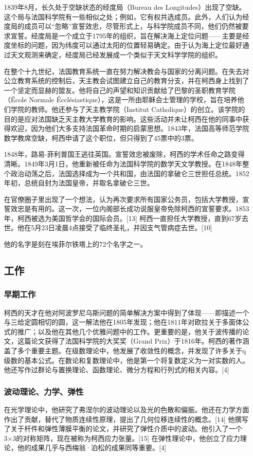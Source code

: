 1839年8月，长久处于空缺状态的经度局（Bureau des Longitudes）出现了空缺。这个局与法国科学院有一些相似之处；例如，它有权共选成员。此外，人们认为经度局的成员可以“忽略”宣誓效忠，尽管形式上，与科学院成员不同，他们仍然被要求宣誓。经度局是一个成立于1795年的组织，旨在解决海上定位问题——主要是经度坐标的问题，因为纬度可以通过太阳的位置轻易确定。由于认为海上定位最好通过天文观测来确定，经度局已经发展成一个类似于天文科学学院的组织。

在整个十九世纪，法国教育系统一直在努力解决教会与国家的分离问题。在失去对公立教育系统的控制后，天主教会试图建立自己的教育分支，并在柯西身上找到了一个坚定而显赫的盟友。他将自己的声望和知识贡献给了巴黎的圣职教育学院（École Normale Écclésiastique），这是一所由耶稣会士管理的学校，旨在培养他们学院的教师。他还参与了天主教学院（Institut Catholique）的创立。该学院的目的是应对法国缺乏天主教大学教育的影响。这些活动并未让柯西在他的同事中获得欢迎，因为他们大多支持法国革命时期的启蒙思想。1843年，法国高等师范学院数学教席空缺，柯西申请了这个职位，但只得到了45票中的3票。

1848年，路易-菲利普国王逃往英国。宣誓效忠被废除，柯西的学术任命之路变得清晰。1849年3月1日，他重新被任命为法国科学院的数学天文学教授。在1848年整个政治动荡之后，法国选择成为一个共和国，由法国的拿破仑三世担任总统。1852年初，总统自封为法国皇帝，并取名拿破仑三世。

在官僚圈子里出现了一个想法，认为再次要求所有国家公务员，包括大学教授，宣誓效忠是有用的。这一次，一位内阁部长成功说服皇帝免除柯西的宣誓要求。1853年，柯西被选为美国哲学会的国际会员。[13] 柯西一直担任大学教授，直到67岁去世。他在5月23日凌晨4点接受了临终圣礼，并因支气管病症去世。[10]

他的名字是刻在埃菲尔铁塔上的72个名字之一。
\subsection{工作}  
\subsubsection{早期工作}  
柯西的天才在他对阿波罗尼乌斯问题的简单解决方案中得到了体现——即描述一个与三给定圆相切的圆，这一解法他在1805年发现；他在1811年对欧拉关于多面体公式的推广；以及他在其他几个优雅问题中的工作。更重要的是，他关于波传播的论文，这篇论文获得了法国科学院的大奖奖（Grand Prix）于1816年。柯西的著作涵盖了多个重要主题。在级数理论中，他发展了收敛性的概念，并发现了许多关于q级数的基本公式。在数论和复数理论中，他是第一个将复数定义为一对实数的人。他还写作过群论与置换理论、函数理论、微分方程和行列式的相关内容。[4]
\subsubsection{波动理论、力学、弹性}  
在光学理论中，他研究了弗涅尔的波动理论以及光的色散和偏振。他还在力学方面作出了贡献，替代了物质连续性原理，提出了几何位移连续性的概念。[14] 他撰写了关于杆件和弹性薄膜平衡的论文，并研究了弹性介质中的波动。他引入了一个3×3的对称矩阵，现在被称为柯西应力张量。[15] 在弹性理论中，他创立了应力理论，他的成果几乎与西梅翁·泊松的成果同等重要。[4]

